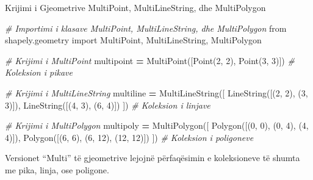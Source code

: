 \documentclass[
  ignorenonframetext,
]{beamer}
\newenvironment{Shaded}{\begin{snugshade}}{\end{snugshade}}
\newcommand{\CommentTok}[1]{\textcolor[rgb]{0.56,0.35,0.01}{\textit{#1}}}
\newcommand{\DecValTok}[1]{\textcolor[rgb]{0.00,0.00,0.81}{#1}}
\newcommand{\ImportTok}[1]{#1}
\newcommand{\NormalTok}[1]{#1}
\newcommand{\OperatorTok}[1]{\textcolor[rgb]{0.81,0.36,0.00}{\textbf{#1}}}
\begin{document}
\begin{frame}[fragile]{Krijimi i Gjeometrive MultiPoint,
MultiLineString, dhe MultiPolygon}
\protect\hypertarget{krijimi-i-gjeometrive-multipoint-multilinestring-dhe-multipolygon}{}

\begin{Shaded}
\begin{Highlighting}[]
\CommentTok{\# Importimi i klasave MultiPoint, MultiLineString, dhe MultiPolygon}
\ImportTok{from}\NormalTok{ shapely.geometry }\ImportTok{import}\NormalTok{ MultiPoint, MultiLineString, MultiPolygon}

\CommentTok{\# Krijimi i MultiPoint}
\NormalTok{multipoint }\OperatorTok{=}\NormalTok{ MultiPoint([Point(}\DecValTok{2}\NormalTok{, }\DecValTok{2}\NormalTok{), Point(}\DecValTok{3}\NormalTok{, }\DecValTok{3}\NormalTok{)])  }\CommentTok{\# Koleksion i pikave}

\CommentTok{\# Krijimi i MultiLineString}
\NormalTok{multiline }\OperatorTok{=}\NormalTok{ MultiLineString([}
\NormalTok{    LineString([(}\DecValTok{2}\NormalTok{, }\DecValTok{2}\NormalTok{), (}\DecValTok{3}\NormalTok{, }\DecValTok{3}\NormalTok{)]),}
\NormalTok{    LineString([(}\DecValTok{4}\NormalTok{, }\DecValTok{3}\NormalTok{), (}\DecValTok{6}\NormalTok{, }\DecValTok{4}\NormalTok{)])}
\NormalTok{])  }\CommentTok{\# Koleksion i linjave}

\CommentTok{\# Krijimi i MultiPolygon}
\NormalTok{multipoly }\OperatorTok{=}\NormalTok{ MultiPolygon([}
\NormalTok{    Polygon([(}\DecValTok{0}\NormalTok{, }\DecValTok{0}\NormalTok{), (}\DecValTok{0}\NormalTok{, }\DecValTok{4}\NormalTok{), (}\DecValTok{4}\NormalTok{, }\DecValTok{4}\NormalTok{)]),}
\NormalTok{    Polygon([(}\DecValTok{6}\NormalTok{, }\DecValTok{6}\NormalTok{), (}\DecValTok{6}\NormalTok{, }\DecValTok{12}\NormalTok{), (}\DecValTok{12}\NormalTok{, }\DecValTok{12}\NormalTok{)])}
\NormalTok{])  }\CommentTok{\# Koleksion i poligoneve}
\end{Highlighting}
\end{Shaded}

Versionet ``Multi'' të gjeometrive lejojnë përfaqësimin e koleksioneve
të shumta me pika, linja, ose poligone.
\end{frame}
\end{document}

